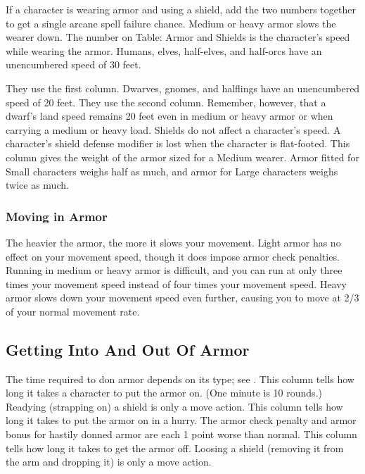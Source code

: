  If a character is wearing armor and using a shield, add the two numbers together to get a single arcane spell failure chance.
 Medium or heavy armor slows the wearer down. The number on Table: Armor and Shields is the character's speed while wearing the armor. Humans, elves, half-elves, and half-orcs have an unencumbered speed of 30 feet.
\par They use the first column. Dwarves, gnomes, and halflings have an unencumbered speed of 20 feet. They use the second column. Remember, however, that a dwarf's land speed remains 20 feet even in medium or heavy armor or when carrying a medium or heavy load.
 Shields do not affect a character's speed.
 A character's shield defense modifier is lost when the character is flat-footed.
 This column gives the weight of the armor sized for a Medium wearer. Armor fitted for Small characters weighs half as much, and armor for Large characters weighs twice as much.

\subsubsection{Moving in Armor}
The heavier the armor, the more it slows your movement. Light armor has no effect on your movement speed, though it does impose armor check penalties. Running in medium or heavy armor is difficult, and you can run at only three times your movement speed instead of four times your movement speed. Heavy armor slows down your movement speed even further, causing you to move at 2/3 of your normal movement rate.

\subsection{Getting Into And Out Of Armor}
The time required to don armor depends on its type; see .
 This column tells how long it takes a character to put the armor on. (One minute is 10 rounds.) Readying (strapping on) a shield is only a move action.
 This column tells how long it takes to put the armor on in a hurry. The armor check penalty and armor bonus for hastily donned armor are each 1 point worse than normal.
 This column tells how long it takes to get the armor off. Loosing a shield (removing it from the arm and dropping it) is only a move action.

